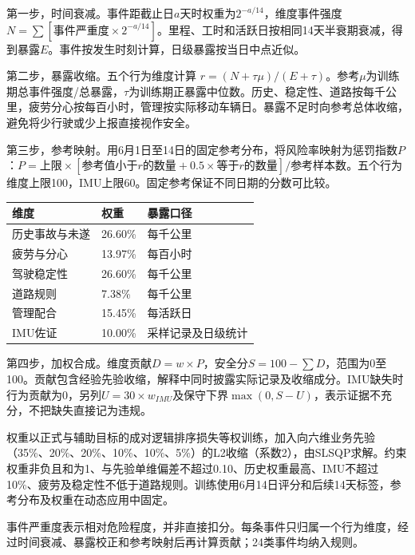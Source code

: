 \documentclass[UTF8,10pt]{ctexart}
\newcommand{\hdr}[1]{\par\vspace{0.4em}{\large\heiti\color{heading}#1}\par\vspace{0.4em}}
\newcommand{\secpage}[1]{\clearpage\hdr{#1}}
\newcommand{\thead}[1]{\textbf{\color{heading}#1}}
\begin{document}
第一步，时间衰减。事件距截止日$a$天时权重为$2^{-a/14}$，维度事件强度 $N=\sum[\text{事件严重度}\times2^{-a/14}]$。里程、工时和活跃日按相同14天半衰期衰减，得到暴露$E$。事件按发生时刻计算，日级暴露按当日中点近似。

第二步，暴露收缩。五个行为维度计算 $r=(N+\tau\mu)/(E+\tau)$。参考$\mu$为训练期总事件强度/总暴露，$\tau$为训练期正暴露中位数。历史、稳定性、道路按每千公里，疲劳分心按每百小时，管理按实际移动车辆日。暴露不足时向参考总体收缩，避免将少行驶或少上报直接视作安全。

第三步，参考映射。用6月1日至14日的固定参考分布，将风险率映射为惩罚指数$P$：$P=\text{上限}\times[\text{参考值小于}r\text{的数量}+0.5\times\text{等于}r\text{的数量}]/\text{参考样本数}$。五个行为维度上限100，IMU上限60。固定参考保证不同日期的分数可比较。

\begin{center}\small
{}
\begin{tabularx}{\textwidth}{p{4.2cm} p{2.4cm} Y}
\thead{维度} & \thead{权重} & \thead{暴露口径} \\
\hline
历史事故与未遂 & 26.60\% & 每千公里 \\
\hline
疲劳与分心 & 13.97\% & 每百小时 \\
\hline
驾驶稳定性 & 26.60\% & 每千公里 \\
\hline
道路规则 & 7.38\% & 每千公里 \\
\hline
管理配合 & 15.45\% & 每活跃日 \\
\hline
IMU佐证 & 10.00\% & 采样记录及日级统计 \\
\hline
\end{tabularx}
\end{center}

第四步，加权合成。维度贡献$D=w\times P$，安全分$S=100-\sum D$，范围为0至100。贡献包含经验先验收缩，解释中同时披露实际记录及收缩成分。IMU缺失时行为贡献为0，另列$U=30\times w_{IMU}$及保守下界$\max(0,S-U)$，表示证据不充分，不把缺失直接记为违规。

{权重以正式与辅助目标的成对逻辑排序损失等权训练，加入向六维业务先验（35\%、20\%、20\%、10\%、10\%、5\%）的L2收缩（系数2），由SLSQP求解。约束权重非负且和为1、与先验单维偏差不超过0.10、历史权重最高、IMU不超过10\%、疲劳及稳定性不低于道路规则。训练使用6月14日评分和后续14天标签，参考分布及权重在动态应用中固定。}

\secpage{05\;|\;行为细则、IMU佐证与可信度}

事件严重度表示相对危险程度，并非直接扣分。每条事件只归属一个行为维度，经过时间衰减、暴露校正和参考映射后再计算贡献；24类事件均纳入规则。
\end{document}
